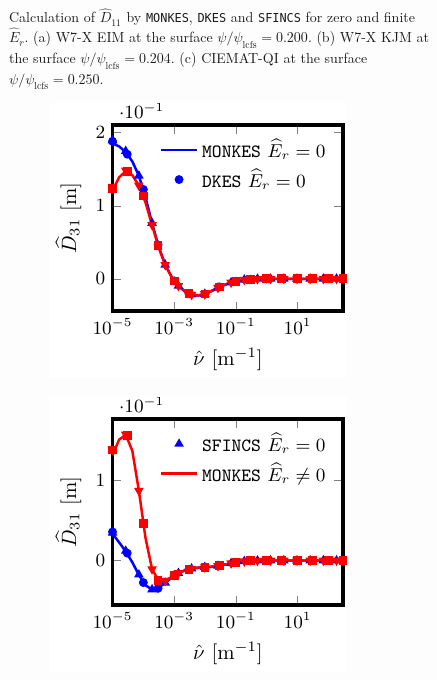 \documentclass[10pt]{iopart}
\begin{document}
\begin{figure}[h]
\begin{subfigure}[t]{0.32\textwidth}
%		
		\caption{}
		\label{subfig:D11_Benchmark_CIEMAT_QI}
	\end{subfigure}
	\caption{Calculation of $\widehat{D}_{11}$ by \texttt{MONKES}, \texttt{DKES} and \texttt{SFINCS} for zero and finite $\widehat{E}_r$. (a) W7-X EIM at the surface $\psi /\psi_{\text{lcfs}}=0.200$. (b) W7-X KJM at the surface $\psi /\psi_{\text{lcfs}}=0.204$. (c) CIEMAT-QI at the surface $\psi /\psi_{\text{lcfs}}=0.250$. }
	\label{fig:D11_Benchmark}
\end{figure}
\begin{figure}[h]
	\centering
	\captionsetup[sub]{skip=-1.75pt, margin=80pt}
	\begin{subfigure}[t]{0.32\textwidth}	
		\includegraphics{Benchmark-W7X-EIM-s0200-D31}
%		
		\caption{}
		\label{subfig:D31_Benchmark_W7X_EIM}
	\end{subfigure}
	\begin{subfigure}[t]{0.32\textwidth}		
		\includegraphics{Benchmark-W7X-KJM-s0204-D31}

\end{subfigure}
\end{figure}
\end{document}

